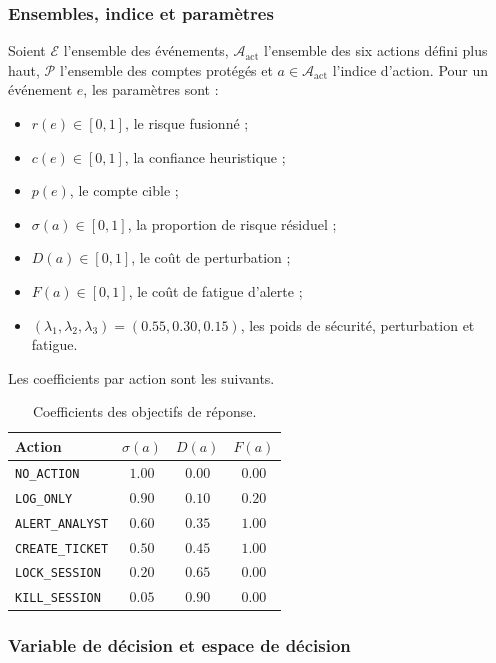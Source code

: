 \documentclass[11pt,a4paper,oneside]{report}
\theoremstyle{definition}
\theoremstyle{plain}
\begin{document}
\subsubsection*{Ensembles, indice et paramètres}

Soient $\mathcal{E}$ l'ensemble des événements, $\mathcal{A}_{\mathrm{act}}$
l'ensemble des six actions défini plus haut, $\mathcal{P}$ l'ensemble des
comptes protégés et $a\in\mathcal{A}_{\mathrm{act}}$ l'indice d'action. Pour un
événement $e$, les paramètres sont :
\begin{itemize}[leftmargin=1.8em]
  \item $r(e)\in[0,1]$, le risque fusionné ;
  \item $c(e)\in[0,1]$, la confiance heuristique ;
  \item $p(e)$, le compte cible ;
  \item $\sigma(a)\in[0,1]$, la proportion de risque résiduel ;
  \item $D(a)\in[0,1]$, le coût de perturbation ;
  \item $F(a)\in[0,1]$, le coût de fatigue d'alerte ;
  \item $(\lambda_1,\lambda_2,\lambda_3)=(0.55,0.30,0.15)$, les poids de
  sécurité, perturbation et fatigue.
\end{itemize}

Les coefficients par action sont les suivants.
\begin{table}[H]
\centering
\caption{Coefficients des objectifs de réponse.}
\label{tab:ai-ro-response-costs}
\small
\begin{tabular}{@{}lccc@{}}
\toprule
Action & $\sigma(a)$ & $D(a)$ & $F(a)$\\
\midrule
\texttt{NO\_ACTION} & $1.00$ & $0.00$ & $0.00$\\
\texttt{LOG\_ONLY} & $0.90$ & $0.10$ & $0.20$\\
\texttt{ALERT\_ANALYST} & $0.60$ & $0.35$ & $1.00$\\
\texttt{CREATE\_TICKET} & $0.50$ & $0.45$ & $1.00$\\
\texttt{LOCK\_SESSION} & $0.20$ & $0.65$ & $0.00$\\
\texttt{KILL\_SESSION} & $0.05$ & $0.90$ & $0.00$\\
\bottomrule
\end{tabular}
\end{table}

\subsubsection*{Variable de décision et espace de décision}
\end{document}
